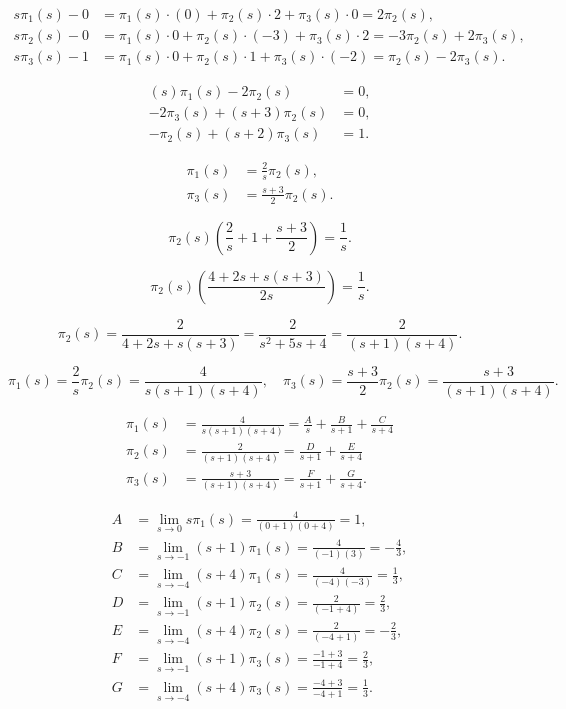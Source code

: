 \[
	\begin{aligned}
		s \pi_1(s)-0 & = \pi_1(s)\cdot(0) + \pi_2(s)\cdot 2 + \pi_3(s)\cdot 0 = 2\pi_2(s),             \\
		s \pi_2(s)-0 & = \pi_1(s)\cdot 0 + \pi_2(s)\cdot(-3) + \pi_3(s)\cdot 2 = -3\pi_2(s)+2\pi_3(s), \\
		s \pi_3(s)-1 & = \pi_1(s)\cdot 0 + \pi_2(s)\cdot 1 + \pi_3(s)\cdot(-2) = \pi_2(s)-2\pi_3(s).
	\end{aligned}
\]

\[
	\begin{aligned}
		(s)\pi_1(s)-2\pi_2(s)    & = 0, \\
		-2\pi_3(s)+(s+3)\pi_2(s) & = 0, \\
		-\pi_2(s)+(s+2)\pi_3(s)  & = 1.
	\end{aligned}
\]

\[
	\begin{aligned}
		\pi_1(s) & = \frac{2}{s}\pi_2(s),   \\
		\pi_3(s) & = \frac{s+3}{2}\pi_2(s).
	\end{aligned}
\]

\[
	\pi_2(s)\left(\frac{2}{s}+1+\frac{s+3}{2}\right) = \frac{1}{s}.
\]

\[
	\pi_2(s)\left(\frac{4+2s+s(s+3)}{2s}\right) = \frac{1}{s}.
\]

\[
	\pi_2(s) = \frac{2}{4+2s+s(s+3)}
	= \frac{2}{s^2+5s+4}
	=\frac{2}{(s+1)(s+4)}.
\]

\[
	\pi_1(s) = \frac{2}{s} \pi_2(s) = \frac{4}{s(s+1)(s+4)},
	\quad
	\pi_3(s) = \frac{s+3}{2} \pi_2(s) = \frac{s+3}{(s+1)(s+4)}.
\]

\[
	\begin{aligned}
		\pi_1(s) & = \frac{4}{s(s+1)(s+4)}
		= \frac{A}{s} + \frac{B}{s+1} + \frac{C}{s+4}                         \\
		\pi_2(s) & = \frac{2}{(s+1)(s+4)} = \frac{D}{s+1} + \frac{E}{s+4}     \\
		\pi_3(s) & =	 \frac{s+3}{(s+1)(s+4)} = \frac{F}{s+1} + \frac{G}{s+4}.
	\end{aligned}
\]

\[
	\begin{aligned}
		A & = \lim_{s\rightarrow 0} s\pi_1(s)      = \frac{4}{(0+1)(0+4)} = 1,         \\
		B & = \lim_{s\rightarrow -1} (s+1)\pi_1(s) = \frac{4}{(-1)(3)} = -\frac{4}{3}, \\
		C & = \lim_{s\rightarrow -4} (s+4)\pi_1(s) = \frac{4}{(-4)(-3)} = \frac{1}{3}, \\
		D & = \lim_{s\rightarrow -1} (s+1)\pi_2(s) = \frac{2}{(-1+4)} = \frac{2}{3},   \\
		E & = \lim_{s\rightarrow -4} (s+4)\pi_2(s) = \frac{2}{(-4+1)} = -\frac{2}{3},  \\
		F & = \lim_{s\rightarrow -1} (s+1)\pi_3(s) = \frac{-1+3}{-1+4} = \frac{2}{3},  \\
		G & = \lim_{s\rightarrow -4} (s+4)\pi_3(s) = \frac{-4+3}{-4+1} = \frac{1}{3}.
	\end{aligned}
\]

